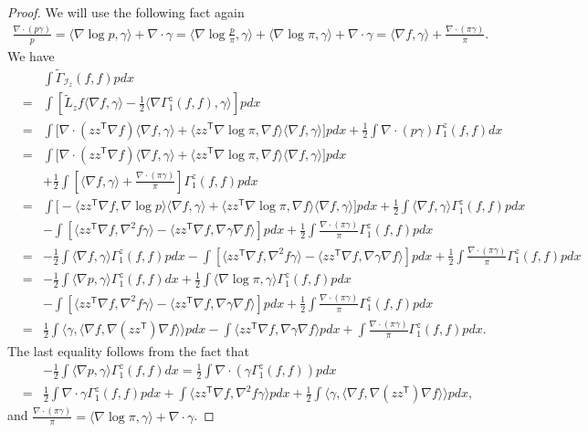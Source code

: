 \documentclass[11pt,reqno]{amsart}
\newcommand{\la}{\langle}
\newcommand{\ra}{\rangle}
\newcommand{\ts}{\mathsf{T}}
\newcommand{\beaa}{\begin{eqnarray*}}
\newcommand{\eeaa}{\end{eqnarray*}}
\def\qed{ \hfill \vrule width.25cm height.25cm depth0cm\smallskip}
\begin{document}
\begin{proof}
We will use the following fact again 
\beaa
\frac{\nabla\cdot({p}  \gamma)}{{p} }=\la \nabla \log{p} ,\gamma\ra +\nabla\cdot\gamma =\la \nabla \log\frac{{p} }{\pi},\gamma\ra+\la \nabla \log \pi,\gamma\ra +\nabla\cdot\gamma =\la \nabla f,\gamma\ra +\frac{\nabla\cdot (\pi\gamma)}{\pi}.
\eeaa
We have 
	\beaa
	&&\int \widetilde\Gamma_{\mathcal I_z}(f,f){p}  dx\\
	&=& \int [\widetilde L_z f\la \nabla f, \gamma\ra -\frac{1}{2}\la \nabla\Gamma_1^z(f,f),\gamma\ra ]{p}  dx\\
	&=&\int \Big[\nabla\cdot(zz^{\ts}\nabla f)\la \nabla f, \gamma\ra+\la zz^{\ts}\nabla\log\pi,\nabla f\ra \la \nabla f, \gamma\ra\Big]{p}  dx+\frac{1}{2}\int\nabla\cdot ({p} \gamma)\Gamma_1^z(f,f)dx\\
	&=&\int \Big[\nabla\cdot(zz^{\ts}\nabla f)\la \nabla f, \gamma\ra+\la zz^{\ts}\nabla\log\pi,\nabla f\ra \la \nabla f, \gamma\ra\Big]{p}  dx\\
	&&+\frac{1}{2}\int [\la \nabla f,\gamma\ra +\frac{\nabla\cdot (\pi\gamma)}{\pi} ]\Gamma_1^z(f,f){p}  dx\\
	&=&\int \Big[-\la zz^{\ts}\nabla f,\nabla \log {p} \ra  \la \nabla f, \gamma\ra+\la zz^{\ts}\nabla\log\pi,\nabla f\ra \la \nabla f, \gamma\ra\Big]{p}  dx+\frac{1}{2}\int \la \nabla f,\gamma\ra\Gamma_1^z(f,f){p}  dx\\
&&-\int [\la zz^{\ts}\nabla f, \nabla^2 f\gamma\ra-\la zz^{\ts}\nabla f,\nabla\gamma\nabla f\ra]{p}  dx+\frac{1}{2}\int \frac{\nabla\cdot (\pi\gamma)}{\pi} \Gamma_1^z(f,f){p}  dx\\
&=&-\frac{1}{2}\int \la \nabla f,\gamma\ra\Gamma_1^z(f,f){p}  dx-\int [\la zz^{\ts}\nabla f, \nabla^2 f\gamma\ra-\la zz^{\ts}\nabla f,\nabla\gamma\nabla f\ra]{p}  dx+\frac{1}{2}\int \frac{\nabla\cdot (\pi\gamma)}{\pi} \Gamma_1^z(f,f){p}  dx\\
&=&-\frac{1}{2}\int \la \nabla  {p} ,\gamma\ra\Gamma_1^z(f,f) dx+\frac{1}{2}\int \la \nabla \log \pi,\gamma\ra\Gamma_1^z(f,f){p}  dx\\
&&-\int [\la zz^{\ts}\nabla f, \nabla^2 f\gamma\ra-\la zz^{\ts}\nabla f,\nabla\gamma\nabla f\ra]{p}  dx+\frac{1}{2}\int \frac{\nabla\cdot (\pi\gamma)}{\pi} \Gamma_1^z(f,f){p}  dx\\
&=&\frac{1}{2}\int \la \gamma,\la \nabla f, \nabla(zz^{\ts})\nabla f\ra \ra {p}  dx-\int \la zz^{\ts}\nabla f, \nabla \gamma \nabla f\ra {p}  dx +\int \frac{\nabla\cdot (\pi\gamma)}{\pi} \Gamma_1^z(f,f){p}  dx.
	\eeaa
	The last equality follows from the fact that 
	\beaa
&&-\frac{1}{2}\int \la \nabla  {p} ,\gamma\ra\Gamma_1^z(f,f) dx=	\frac{1}{2}\int \nabla\cdot (\gamma \Gamma_1^z(f,f)){p}  dx\\
&=&\frac{1}{2}\int\nabla\cdot \gamma \Gamma_1^z(f,f){p}  dx +\int \la zz^{\ts}\nabla f, \nabla^2 f\gamma\ra {p}  dx+\frac{1}{2}\int \la \gamma,\la \nabla f, \nabla(zz^{\ts})\nabla f\ra \ra {p}  dx,
	\eeaa
	and 
	$\frac{\nabla\cdot(\pi \gamma)}{\pi}	=\la \nabla \log\pi,\gamma\ra +\nabla\cdot \gamma$.
	\qed
\end{proof}
 
\end{document}
